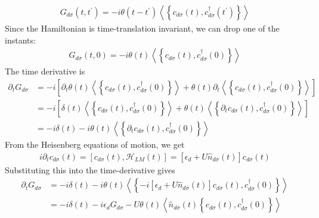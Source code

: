 \documentclass[twoside]{report}
\numberwithin{equation}{section}
\begin{document}
\begin{equation}\begin{aligned}
	G_{d\sigma}(t, t^\prime) = -i\theta(t-t^\prime) \left<\left\{ c_{d\sigma}(t), c^\dagger_{d\sigma}(t^\prime) \right\} \right>
\end{aligned}\end{equation}
Since the Hamiltonian is time-translation invariant, we can drop one of the instants:
\begin{equation}\begin{aligned}
	G_{d\sigma}(t, 0) = -i\theta(t) \left<\left\{ c_{d\sigma}(t), c^\dagger_{d\sigma}(0) \right\} \right>
\end{aligned}\end{equation}
The time derivative is
\begin{equation}\begin{aligned}
	\partial_t G_{d\sigma} &= -i \left[\partial_t \theta(t) \left<\left\{ c_{d\sigma}(t), c^\dagger_{d\sigma}(0) \right\} \right> + \theta(t) \partial_t \left<\left\{ c_{d\sigma}(t), c^\dagger_{d\sigma}(0) \right\} \right>\right] \\
			       &= -i \left[\delta(t) \left<\left\{ c_{d\sigma}(t), c^\dagger_{d\sigma}(0) \right\} \right> + \theta(t) \left<\left\{ \partial_t c_{d\sigma}(t), c^\dagger_{d\sigma}(0) \right\} \right>\right]\\
			       &= -i \delta(t) -i\theta(t) \left<\left\{ \partial_t c_{d\sigma}(t), c^\dagger_{d\sigma}(0) \right\} \right>
\end{aligned}\end{equation}
From the Heisenberg equations of motion, we get
\begin{equation}\begin{aligned}
	i \partial_t c_{d\sigma}(t) = \left[c_{d\sigma}(t), \mathcal{H}_{LM}(t)\right] = \left[\epsilon_d + U \hat n_{d\overline\sigma}(t)\right]c_{d\sigma}(t)
\end{aligned}\end{equation}
Substituting this into the time-derivative gives
\begin{equation}\begin{aligned}
	\partial_t G_{d\sigma} &= -i \delta(t) -i \theta(t) \left<\left\{ -i\left[\epsilon_d + U \hat n_{d\overline\sigma}(t)\right]c_{d\sigma}(t), c^\dagger_{d\sigma}(0) \right\} \right>\\
			       &= -i \delta(t) - i\epsilon_d G_{d\sigma} - U \theta(t) \left<\hat n_{d\overline\sigma}(t)\left\{c_{d\sigma}(t), c^\dagger_{d\sigma}(0) \right\} \right>\\
\end{aligned}\end{equation}
\end{document}
